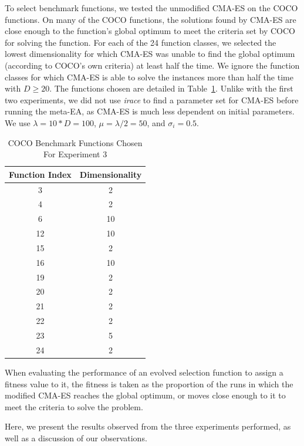 \documentclass[times,12pt,titlepage]{mstogs}
\begin{document}
\begin{ThesisBody}
To select benchmark functions, we tested the unmodified CMA-ES on the COCO functions. On many of the COCO functions, the solutions found by CMA-ES are close enough to the function's global optimum to meet the criteria set by COCO for solving the function. For each of the 24 function classes, we selected the lowest dimensionality for which CMA-ES was unable to find the global optimum (according to COCO's own criteria) at least half the time. We ignore the function classes for which CMA-ES is able to solve the instances more than half the time with $D\geq20$. The functions chosen are detailed in Table~\ref{tab:experiment3chosenFunctions}. Unlike with the first two experiments, we did not use \textit{irace} to find a parameter set for CMA-ES before running the meta-EA, as CMA-ES is much less dependent on initial parameters. We use $\lambda=10*D=100$, $\mu = \lambda/2 = 50$, and $\sigma_i = 0.5$. 

\begin{table}
\centering
  \caption{COCO Benchmark Functions Chosen For Experiment 3}
  \label{tab:experiment3chosenFunctions}
  \begin{tabular}{c|c}
    \toprule
    Function Index & Dimensionality \\
    \midrule
    3 & 2\\
    \hline
    4& 2\\
    \hline
    6& 10\\
    \hline
    12& 10\\
    \hline
    15& 2\\
    \hline
    16& 10\\
    \hline
    19& 2\\
    \hline
    20& 2\\
    \hline
    21& 2\\
    \hline
    22& 2\\
    \hline
    23& 5\\
    \hline
    24& 2\\                        
	
  \bottomrule
\end{tabular}
\end{table}

When evaluating the performance of an evolved selection function to assign a fitness value to it, the fitness is taken as the proportion of the runs in which the modified CMA-ES reaches the global optimum, or moves close enough to it to meet the criteria to solve the problem.

\label{Results}
Here, we present the results observed from the three experiments performed, as well as a discussion of our observations.


\end{ThesisBody}
\end{document}
